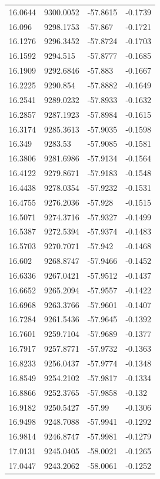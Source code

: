 \begin{table}[H]
\begin{tabular}{llll}
16.0644 & 9300.0052 & -57.8615 & -0.1739 \\
16.096 & 9298.1753 & -57.867 & -0.1721 \\
16.1276 & 9296.3452 & -57.8724 & -0.1703 \\
16.1592 & 9294.515 & -57.8777 & -0.1685 \\
16.1909 & 9292.6846 & -57.883 & -0.1667 \\
16.2225 & 9290.854 & -57.8882 & -0.1649 \\
16.2541 & 9289.0232 & -57.8933 & -0.1632 \\
16.2857 & 9287.1923 & -57.8984 & -0.1615 \\
16.3174 & 9285.3613 & -57.9035 & -0.1598 \\
16.349 & 9283.53 & -57.9085 & -0.1581 \\
16.3806 & 9281.6986 & -57.9134 & -0.1564 \\
16.4122 & 9279.8671 & -57.9183 & -0.1548 \\
16.4438 & 9278.0354 & -57.9232 & -0.1531 \\
16.4755 & 9276.2036 & -57.928 & -0.1515 \\
16.5071 & 9274.3716 & -57.9327 & -0.1499 \\
16.5387 & 9272.5394 & -57.9374 & -0.1483 \\
16.5703 & 9270.7071 & -57.942 & -0.1468 \\
16.602 & 9268.8747 & -57.9466 & -0.1452 \\
16.6336 & 9267.0421 & -57.9512 & -0.1437 \\
16.6652 & 9265.2094 & -57.9557 & -0.1422 \\
16.6968 & 9263.3766 & -57.9601 & -0.1407 \\
16.7284 & 9261.5436 & -57.9645 & -0.1392 \\
16.7601 & 9259.7104 & -57.9689 & -0.1377 \\
16.7917 & 9257.8771 & -57.9732 & -0.1363 \\
16.8233 & 9256.0437 & -57.9774 & -0.1348 \\
16.8549 & 9254.2102 & -57.9817 & -0.1334 \\
16.8866 & 9252.3765 & -57.9858 & -0.132 \\
16.9182 & 9250.5427 & -57.99 & -0.1306 \\
16.9498 & 9248.7088 & -57.9941 & -0.1292 \\
16.9814 & 9246.8747 & -57.9981 & -0.1279 \\
17.0131 & 9245.0405 & -58.0021 & -0.1265 \\
17.0447 & 9243.2062 & -58.0061 & -0.1252 \\

\end{tabular}
\end{table}

